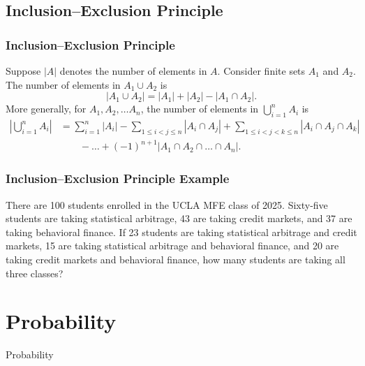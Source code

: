 \documentclass{beamer}
\begin{document}
\subsection{Inclusion--Exclusion Principle}

\begin{frame}
\frametitle{Inclusion--Exclusion Principle}

\begin{Theorem}
Suppose $|A|$ denotes the number of elements in $A$. Consider finite sets $A_1$ and $A_2$. The number of elements in $A_1\cup A_2$ is
$$
|A_1\cup A_2| = |A_1| + |A_2| - |A_1\cap A_2|.
$$
More generally, for $A_1, A_2,\ldots A_n$, the number of elements in $\displaystyle\bigcup_{i = 1}^n A_i$ is
\begin{align*}
\left|\bigcup_{i = 1}^n A_i\right| &= \sum_{i = 1}^n |A_i| - \sum_{1 \leq i < j \leq n} \left|A_i\cap A_j \right|+ \sum_{1\leq i < j < k\leq n} \left| A_i \cap A_j \cap A_k\right|\\
						&\qquad  - \ldots + (-1)^{n +1} \left|A_1\cap A_2\cap \ldots \cap A_n\right|.
\end{align*}
\end{Theorem}
\end{frame}

\begin{frame}[t]
\frametitle{Inclusion--Exclusion Principle Example}
\tiny
\begin{Example}
There are 100 students enrolled in the UCLA MFE class of 2025. Sixty-five students are taking statistical arbitrage, 43 are taking credit markets, and 37 are taking behavioral finance. If 23 students are taking statistical arbitrage and credit markets, 15 are taking statistical arbitrage and behavioral finance, and 20 are taking credit markets and behavioral finance, how many students are taking all three classes?
\end{Example}
\end{frame}

\section{Probability}

\begin{frame}
\begin{center}
\Huge Probability
\end{center}
\end{frame}
\end{document}
